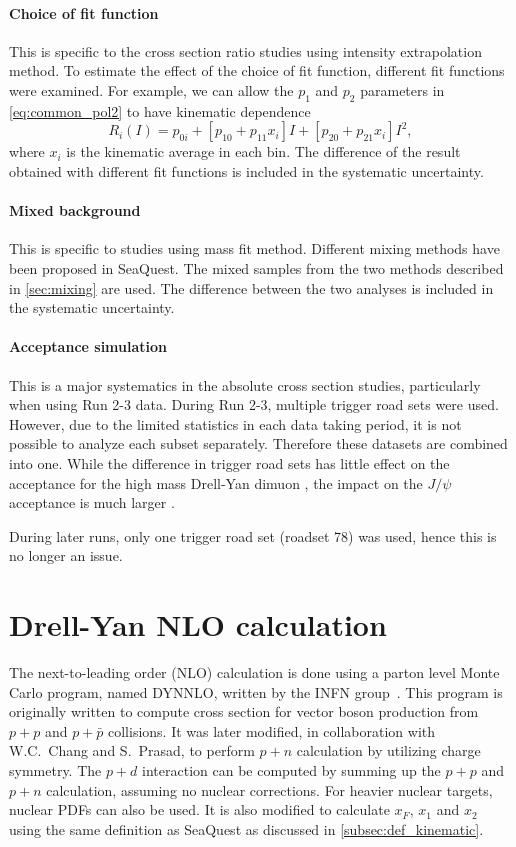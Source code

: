 \documentclass[../main.tex]{subfiles}
\begin{document}
\paragraph{Choice of fit function}
This is specific to the cross section ratio studies using intensity extrapolation method.
To estimate the effect of the choice of fit function, different fit functions were examined.
For example, we can allow the $p_1$ and $p_2$ parameters in \cref{eq:common_pol2} to have kinematic
dependence
\begin{equation}
	R_i \left(I\right) = p_{0i} + \left[p_{10}+p_{11}x_i\right] I + \left[p_{20}+p_{21}x_i\right] I^2,
\end{equation}
where $x_i$ is the kinematic average in each bin. The difference of the result obtained with different fit
functions is included in the systematic uncertainty.

\paragraph{Mixed background}
This is specific to studies using mass fit method. Different mixing methods have been proposed in SeaQuest.
The mixed samples from the two methods described in \cref{sec:mixing} are used. The difference between
the two analyses is included in the systematic uncertainty.

\paragraph{Acceptance simulation}
This is a major systematics in the absolute cross section studies, particularly when using
Run 2-3 data.
During Run 2-3, multiple trigger road sets were used. However, due to the limited statistics in each
data taking period, it is not possible to analyze each subset separately. Therefore these datasets
are combined into one. While the difference in trigger road sets has little effect on the acceptance
for the high mass Drell-Yan dimuon \cite{jdove-8168}, the impact on the $J/\psi$ acceptance is much
larger \cite{chleung-9643}.

During later runs, only one trigger road set (roadset 78) was used, hence this is no
longer an issue.


\section{Drell-Yan NLO calculation}
\label{sec:DYNNLO}
The next-to-leading order (NLO) calculation is done using a parton level Monte
Carlo program, named DYNNLO, written by the INFN group~\cite{catani2009,catani2007}. This program
is originally written to compute cross section for vector boson
production from $p+p$ and $p+\bar{p}$ collisions. It was later modified, in
collaboration with W.C.~Chang and S.~Prasad, to perform $p+n$ calculation
by utilizing charge symmetry. The $p+d$ interaction can be computed by summing up
the $p+p$ and $p+n$ calculation, assuming no nuclear corrections. For heavier nuclear
targets, nuclear PDFs can also be used. It is also modified to calculate $x_F$, $x_1$ and $x_2$
using the same definition as SeaQuest as discussed in \cref{subsec:def_kinematic}.
\end{document}
